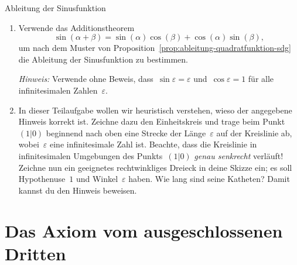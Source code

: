 \documentclass{zirkelblatt}
\theoremstyle{definition}
\theoremstyle{plain}
\theoremstyle{remark}
\begin{document}
\begin{aufgabeShaded}{Ableitung der Sinusfunktion}
\begin{enumerate}
\item Verwende das Additionstheorem
\[ \sin(\alpha+\beta) = \sin(\alpha)\cos(\beta) + \cos(\alpha)\sin(\beta), \]
um nach dem Muster von Proposition~\ref{prop:ableitung-quadratfunktion-sdg} die
Ableitung der Sinusfunktion zu bestimmen.

\emph{Hinweis:} Verwende ohne Beweis, dass~$\sin\varepsilon = \varepsilon$
und~$\cos\varepsilon = 1$ für alle infinitesimalen Zahlen~$\varepsilon$.

\item In dieser Teilaufgabe wollen wir heuristisch verstehen, wieso der
angegebene Hinweis korrekt ist. Zeichne dazu den Einheitskreis und trage beim
Punkt~$(1|0)$ beginnend nach oben eine Strecke der Länge~$\varepsilon$ auf der
Kreislinie ab, wobei~$\varepsilon$ eine infinitesimale Zahl ist. Beachte, dass
die Kreislinie in infinitesimalen Umgebungen des Punkts~$(1|0)$ \emph{genau
senkrecht} verläuft! Zeichne nun ein geeignetes rechtwinkliges Dreieck in deine
Skizze ein; es soll Hypothenuse~$1$ und Winkel~$\varepsilon$ haben. Wie lang
sind seine Katheten? Damit kannst du den Hinweis beweisen.
\end{enumerate}
\end{aufgabeShaded}



\section{Das Axiom vom ausgeschlossenen Dritten}
\label{sect:lem}
\end{document}
